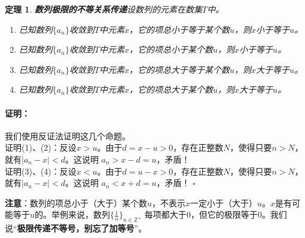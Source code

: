 \documentclass[12pt,UTF8]{ctexbook}
\newtheorem{tm}{定理}[section]
\newenvironment{proof2}{\paragraph{\textbf{证明：}}}{\hfill$\square$}
\begin{document}
\begin{appendix}
\begin{tm}{\textbf{数列极限的不等关系传递}}\label{tm:a-0-40}
    设数列的元素在数集$T$中。
    \begin{enumerate}
        \item 已知数列$\{a_n\}$收敛到$T$中元素$x$，它的项总小于等于某个数$u$，则$x$小于等于$u$。
        \item 已知数列$\{a_n\}$收敛到$T$中元素$x$，它的项总小于某个数$u$，则$x$小于等于$u$。
        \item 已知数列$\{a_n\}$收敛到$T$中元素$x$，它的项总大于等于某个数$u$，则$x$大于等于$u$。
        \item 已知数列$\{a_n\}$收敛到$T$中元素$x$，它的项总大于某个数$u$，则$x$大于等于$u$。
    \end{enumerate}
\end{tm}
\begin{proof2}
    我们使用反证法证明这几个命题。\\
    证明(1)、(2)：反设$x > u$。由于$d = x - u > 0$，存在正整数$N$，使得只要$n>N$，就有$|a_n - x| < d$。这说明
    $a_n > x - d = u$，矛盾！\\
    证明(3)、(4)：反设$x < u$。由于$d = u - x > 0$，存在正整数$N$，使得只要$n>N$，就有$|a_n - x| < d$。这说明
    $a_n < x + d = u$，矛盾！
\end{proof2}

\textbf{注意}：数列的项总小于（大于）某个数$u$，不表示$x$一定小于（大于）$u$。$x$是有可能等于$u$的。举例来说，数列$\{\frac{1}{n}\}_{n\in\mathbb{Z}^+}$
每项都大于$0$，但它的极限等于$0$。我们说“\textbf{极限传递不等号，别忘了加等号}”。


\end{appendix}
\end{document}

